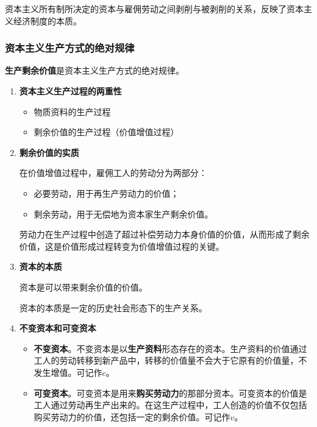 \documentclass[12pt, a4paper, oneside]{ctexart}
\begin{document}
资本主义所有制所决定的资本与雇佣劳动之间剥削与被剥削的关系，反映了资本主义经济制度的本质。

\subsubsection{资本主义生产方式的绝对规律}

\textbf{生产剩余价值}是资本主义生产方式的绝对规律。

\begin{enumerate}
  \item {\bf 资本主义生产过程的两重性}
  
  \begin{itemize}
    \item 物质资料的生产过程
    \item 剩余价值的生产过程（价值增值过程）
  \end{itemize}

  \item {\bf 剩余价值的实质}
  
  在价值增值过程中，雇佣工人的劳动分为两部分：
  \begin{itemize}
    \item 必要劳动，用于再生产劳动力的价值；
    \item 剩余劳动，用于无偿地为资本家生产剩余价值。
  \end{itemize}

  劳动力在生产过程中创造了超过补偿劳动力本身价值的价值，从而形成了剩余价值，这是价值形成过程转变为价值增值过程的关键。

  \item {\bf 资本的本质}
  
  资本是可以带来剩余价值的价值。

  资本的本质是一定的历史社会形态下的生产关系。

  \item {\bf 不变资本和可变资本}
  
  \begin{itemize}
    \item {\bf 不变资本}。不变资本是以\textbf{生产资料}形态存在的资本。生产资料的价值通过工人的劳动转移到新产品中，转移的价值量不会大于它原有的价值量，不发生增值。可记作$c$。
    \item {\bf 可变资本}。可变资本是用来\textbf{购买劳动力}的那部分资本。可变资本的价值是工人通过劳动再生产出来的。在这生产过程中，工人创造的价值不仅包括购买劳动力的价值，还包括一定的剩余价值。可记作$v$。
  \end{itemize}


\end{enumerate}
\end{document}
